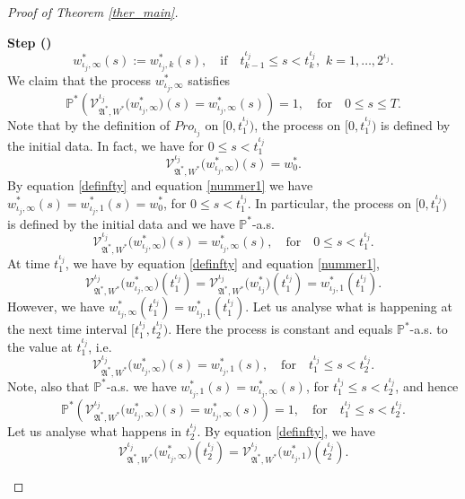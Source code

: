 \documentclass[english,a4paper,11pt]{amsart}
\theoremstyle{plain}
\theoremstyle{definition}
\theoremstyle{remark}
\numberwithin{equation}{section}
\newcounter{lil1}
\newenvironment{step}
{\begin{list} { \bf Step (\Roman{lil1})}
		{ \usecounter{lil1}
			\setlength{\leftmargin}{0.0cm}
			\setlength{\topsep}{0.2cm}
			\setlength{\itemsep}{0.0cm}
			\setlength{\parsep}{0.1cm}
			\setlength{\itemindent}{0.8cm}
			\setlength{\parskip}{0.0cm}}}
	{\end{list}}
\newcounter{lil33}
\newcounter{lil1q}
\newcommand{\MA}{\mathfrak{A}}
\newcommand{\PP}{{\mathbb{P}}}
\newcommand{\Pro}{Pro}
\begin{document}
\begin{proof}[Proof of Theorem \ref{ther_main}]
\begin{step}
\begin{equation}
w_{\iota_j,\infty}^\ast(s) :=   w^\ast_{\iota_j,k}(s),\quad \mbox{if}\quad t^{\iota_j}_{k-1}\le s< t^{\iota_j}_{k},\,\,k=1,\ldots, 2^{\iota_j}.
\end{equation}
%
%
%
We claim that the process $w^\ast_{\iota_j,\infty}$ satisfies
\begin{equation*}
\PP^\ast\left(
\mathcal{V}_{\mathfrak{A}^\ast,W^\ast}^{\iota_j}\big(w^\ast_{\iota_j,\infty}\big) (s) =w^\ast_{\iota_j,\infty }(s)\right)=1, \quad \mbox{for} \quad 0\le s\le T
.
\end{equation*}
Note that
by the definition of $\Pro_{\iota_j}$ on $[0,t_1^{\iota_j})$,
the process on $[0,t_{1}^{\iota_j})$ is defined by the initial data.
In fact, we have
for $0\le s< t^{\iota_j}_1$
$$
\mathcal{V}_{\mathfrak{A}^\ast,W^\ast}^{\iota_j}\big(w^\ast_{\iota_j,\infty}\big)(s)= w^\ast_0.
$$
By equation \eqref{definfty} and equation \eqref{nummer1} we have $w^\ast_{\iota_j,\infty}(s)=w^\ast_{\iota_j,1}(s)=w^\ast_0$, 
for $0\le s< t^{\iota_j}_1$.
%
%
In particular, the process on $[0,t_{1}^{\iota_j})$ is defined by the initial data
and we have  $\PP^\ast$-a.s.
$$\mathcal{V}_{\mathfrak{A}^\ast,W^\ast}^{\iota_j}\big(w^\ast_{\iota_j,\infty}\big)(s)=w^\ast_{\iota_j,\infty}(s)
, \quad \mbox{for} \quad 0\le s<t^{\iota_j}_1.
$$
At time $t^{\iota_j}_1$, we have by equation \eqref{definfty}
and equation \eqref{nummer1}, 
$$
\mathcal{V}_{\mathfrak{A}^\ast,W^\ast}^{\iota_j}\big(w^\ast_{\iota_j,\infty }\big)(t^{\iota_j}_1)=\mathcal{V}_{\mathfrak{A}^\ast,W^\ast}^{\iota_j}  \big(w^\ast_{\iota_j}\big)(t^{\iota_j}_1)=w^\ast_{\iota_j,1}(t^{\iota_j}_1).
$$
However, we have $ w^\ast_{{\iota_j },\infty}(t^{\iota_j}_1)=w^\ast_{\iota_j,1}(t^{\iota_j} _1)$.
Let us analyse what is happening at the next time interval $[t^{\iota_j }_1,t^{\iota_j }_2)$. {Here the process} is constant and equals   $\PP^\ast$-a.s. to the value at $t^{\iota_j }_1$, i.e.
$$
\mathcal{V}_{\mathfrak{A}^\ast,W^\ast}^{\iota_j}\big( w^\ast_{{\iota_j },\infty}\big)(s)
=w^\ast_{\iota_j ,1}(s),  \quad \mbox{for} \quad t^{\iota_j}_1\le s<t^{\iota_j}_2.
$$
Note, also that   $\PP^\ast$-a.s. we have $w^\ast_{\iota_j ,1}(s)=w^\ast_{\iota_j ,\infty}(s)$, for $ t^{\iota_j}_1\le s<t^{\iota_j}_2$, and hence
$$
\PP^\ast\left(\mathcal{V}^{\iota_j }_{\MA^\ast,W^\ast}\big(w^\ast_{\iota_j ,\infty }\big)(s)= w^\ast_{\iota_j ,\infty }(s)\right) =1,  \quad \mbox{for} \quad t^{\iota_j}_1\le s<t^{\iota_j}_2.
$$
Let us analyse what happens in $t^{\iota_j}_2$. By equation \eqref{definfty}, we have
$$
\mathcal{V}_{\mathfrak{A}^\ast,W^\ast}^{\iota_j}\big(w^\ast_{\iota_j,\infty}\big)(t^{\iota_j}_2)=\mathcal{V}_{\mathfrak{A}^\ast,W^\ast}^{\iota_j}\big(w^\ast_{\iota_j,1}\big)(t^{\iota_j}_2).
$$
\end{step}
\end{proof}
\end{document}
